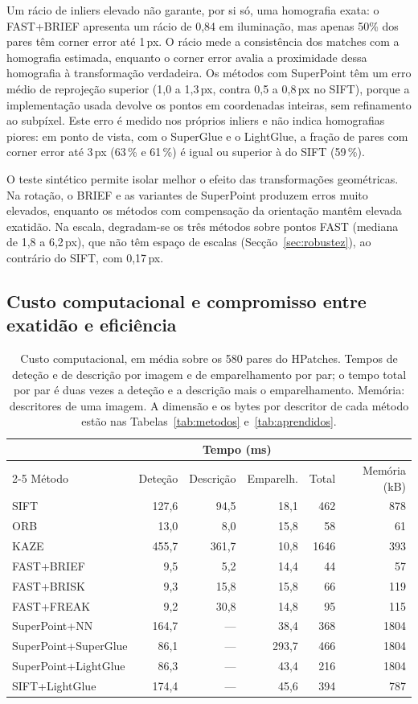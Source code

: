\documentclass[11pt,a4paper]{article}
\begin{document}
Um rácio de inliers elevado não garante, por si só, uma homografia exata: o FAST+BRIEF  apresenta um rácio de 0,84 em iluminação, mas apenas 50\% dos pares têm corner error até 1\,px. O rácio mede a consistência dos matches com a homografia estimada, enquanto o corner error avalia a proximidade dessa homografia à transformação verdadeira. Os métodos com SuperPoint têm um erro médio de reprojeção superior (1,0 a 1,3\,px, contra 0,5 a 0,8\,px no SIFT), porque a implementação usada devolve os pontos em coordenadas inteiras, sem refinamento ao subpíxel. Este erro é medido nos próprios inliers e não indica homografias piores: em ponto de vista, com o SuperGlue e o LightGlue, a fração de pares com corner error até 3\,px (63\,\% e 61\,\%) é igual ou superior à do SIFT (59\,\%).

O teste sintético permite isolar melhor o efeito das transformações geométricas. Na rotação, o BRIEF e as variantes de SuperPoint produzem erros muito elevados, enquanto os métodos com compensação da orientação mantêm elevada exatidão. Na escala, degradam-se os três métodos sobre pontos FAST (mediana de 1,8 a 6,2\,px), que não têm espaço de escalas (Secção~\ref{sec:robustez}), ao contrário do SIFT, com 0,17\,px.

\subsection{Custo computacional e compromisso entre exatidão e eficiência}
\label{sec:custo}
\begin{table}[H]
\centering\small
\caption{Custo computacional, em média sobre os 580 pares do HPatches. Tempos de deteção e de descrição por imagem e de emparelhamento por par; o tempo total por par é duas vezes a deteção e a descrição mais o emparelhamento. Memória: descritores de uma imagem. A dimensão e os bytes por descritor de cada método estão nas Tabelas~\ref{tab:metodos} e~\ref{tab:aprendidos}.
}
\label{tab:custo}
\begin{tabular}{lrrrrr}
\toprule
 & \multicolumn{4}{c}{Tempo (ms)} & \\
\cmidrule(lr){2-5}
Método & Deteção & Descrição & Emparelh. & Total & Memória (kB) \\
\midrule
SIFT & 127,6 & 94,5 & 18,1 & 462 & 878 \\
ORB & 13,0 & 8,0 & 15,8 & 58 & 61 \\
KAZE & 455,7 & 361,7 & 10,8 & 1646 & 393 \\
FAST+BRIEF & 9,5 & 5,2 & 14,4 & 44 & 57 \\
FAST+BRISK & 9,3 & 15,8 & 15,8 & 66 & 119 \\
FAST+FREAK & 9,2 & 30,8 & 14,8 & 95 & 115 \\
\midrule
SuperPoint+NN & 164,7 & --- & 38,4 & 368 & 1804 \\
SuperPoint+SuperGlue & 86,1 & --- & 293,7 & 466 & 1804 \\
SuperPoint+LightGlue & 86,3 & --- & 43,4 & 216 & 1804 \\
SIFT+LightGlue & 174,4 & --- & 45,6 & 394 & 787 \\
\bottomrule
\end{tabular}
\end{table}
\end{document}
